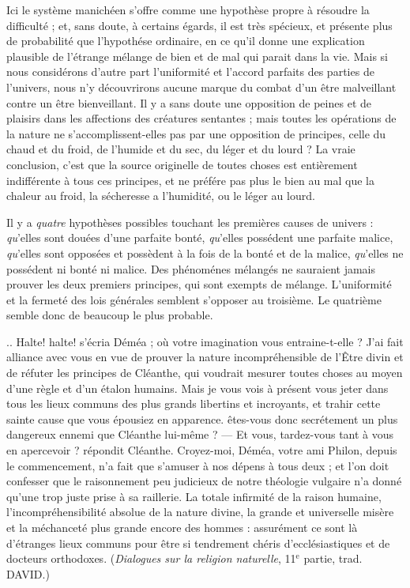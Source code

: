 Ici le système manichéen s’offre comme une hypothèse
propre à résoudre la difficulté ; et, sans doute, à certains
égards, il est très spécieux, et présente plus de probabilité
que l’hypothése ordinaire, en ce qu’il donne une explication
plausible de l’étrange mélange de bien et de mal
qui parait dans la vie. Mais si nous considérons d’autre
part l'uniformité et l'accord parfaits des parties de l’univers,
nous n’y découvrirons aucune marque du combat
d’un être malveillant contre un être bienveillant. Il y a
sans doute une opposition de peines et de plaisirs dans les
affections des créatures sentantes ; mais toutes les opérations
de la nature ne s’accomplissent-elles pas par une
opposition de principes, celle du chaud et du froid, de
l'humide et du sec, du léger et du lourd ? La vraie conclusion,
c’est que la source originelle de toutes choses est
entièrement indifférente à tous ces principes, et ne préfére
pas plus le bien au mal que la chaleur au froid, la sécheresse
a l'humidité, ou le léger au lourd.

Il y a {\it quatre} hypothèses possibles touchant les premières
causes de univers : {\it qu}’elles sont douées d’une parfaite
bonté, {\it qu}’elles possédent une parfaite malice, {\it qu}’elles
sont opposées et possèdent à la fois de la bonté et de la
malice, {\it qu}’elles ne possédent ni bonté ni malice. Des
phénoménes mélangés ne sauraient jamais prouver les
deux premiers principes, qui sont exempts de mélange.
L’uniformité et la fermeté des lois générales semblent
s’opposer au troisième. Le quatrième semble donc de
beaucoup le plus probable.

.. Halte! halte! s’écria Déméa ; où votre imagination
vous entraine-t-elle ? J’ai fait alliance avec vous en vue
de prouver la nature incompréhensible de l’\^Etre divin et
de réfuter les principes de Cléanthe, qui voudrait mesurer
toutes choses au moyen d’une règle et d’un étalon humains.
Mais je vous vois à présent vous jeter dans tous les lieux
communs des plus grands libertins et incroyants, et trahir
cette sainte cause que vous épousiez en apparence. êtes-vous
donc secrétement un plus dangereux ennemi que
Cléanthe lui-même ? — Et vous, tardez-vous tant à vous
en apercevoir ? répondit Cléanthe. Croyez-moi, Déméa,
votre ami Philon, depuis le commencement, n’a fait que
s’amuser à nos dépens à tous deux ; et l’on doit confesser
que le raisonnement peu judicieux de notre théologie
vulgaire n’a donné qu’une trop juste prise à sa raillerie. La
totale infirmité de la raison humaine, l’incompréhensibilité
absolue de la nature divine, la grande et universelle misère
et la méchanceté plus grande encore des hommes : assurément
ce sont là d’étranges lieux communs pour être si tendrement
chéris d’ecclésiastiques et de docteurs orthodoxes.
({\it Dialogues sur la religion naturelle}, 11$^\text{e}$ partie, trad. D{\footnotesize AVID}.)


